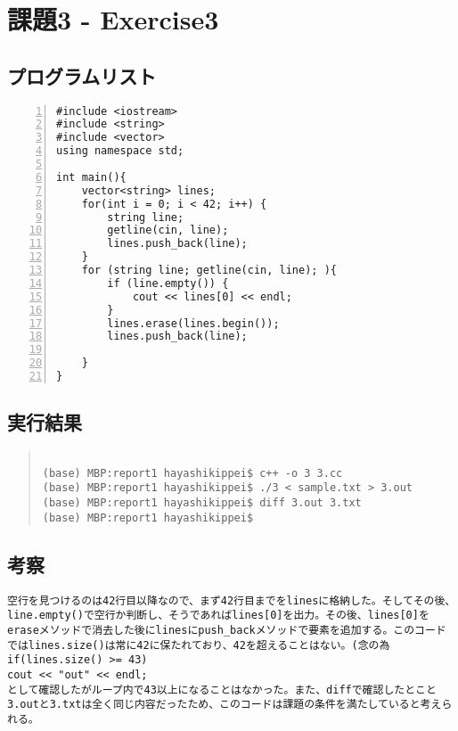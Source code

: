 \documentclass[11pt,a4paper]{jsarticle}
\begin{document}
\section{課題3 - Exercise3}
\subsection{プログラムリスト}
\label{sec:prog-list2}

\begin{lstlisting}[numbers=left,numberstyle=\ttfamily,xleftmargin=2zw]
#include <iostream>
#include <string>
#include <vector>
using namespace std;

int main(){
    vector<string> lines;
    for(int i = 0; i < 42; i++) {
        string line;
        getline(cin, line);
        lines.push_back(line);
    }
    for (string line; getline(cin, line); ){
        if (line.empty()) {
            cout << lines[0] << endl;
        }
        lines.erase(lines.begin());
        lines.push_back(line);
        
    }
}

\end{lstlisting}
%
\subsection{実行結果}
\begin{quote}           %
\begin{verbatim}

(base) MBP:report1 hayashikippei$ c++ -o 3 3.cc
(base) MBP:report1 hayashikippei$ ./3 < sample.txt > 3.out
(base) MBP:report1 hayashikippei$ diff 3.out 3.txt
(base) MBP:report1 hayashikippei$ 

\end{verbatim}
\end{quote}
%
\subsection{考察}
\begin{verbatim}
空行を見つけるのは42行目以降なので、まず42行目までをlinesに格納した。そしてその後、line.empty()で空行か判断し、そうであればlines[0]を出力。その後、lines[0]をeraseメソッドで消去した後にlinesにpush_backメソッドで要素を追加する。このコードではlines.size()は常に42に保たれており、42を超えることはない。(念の為
if(lines.size() >= 43) 
cout << "out" << endl;
として確認したがループ内で43以上になることはなかった。また、diffで確認したとこと3.outと3.txtは全く同じ内容だったため、このコードは課題の条件を満たしていると考えられる。
\end{verbatim}
%
\end{document}
